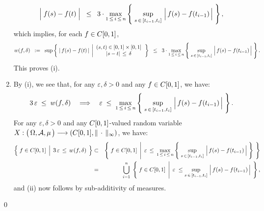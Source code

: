 \begin{enumerate}
		\begin{equation*}
		\left\vert\;f(s)\overset{{\color{white}.}}{-}f(t)\;\right\vert
		\;\;\leq\;\;
			3\cdot\underset{1\,\leq\,i\,\leq\,n}{\max}\left\{\;
				\sup_{s\,\in\,[t_{i-1},t_{i}]}\,\left\vert\,\overset{{\color{white}.}}{f}(s) - f(t_{i-1})\,\right\vert
			\;\right\},
		\end{equation*}
		which implies, for each $f \in C[0,1]$,
		\begin{equation*}
		w(f,\delta)
		\;\;:=\;\;
		\sup\left\{\;
			\left\vert\,f(s) - f(t)\,\right\vert
			\;\left\vert
			\begin{array}{c} (s,t) \in [0,1] \times [0,1] \\ \vert s - t \vert\,\leq\,\delta \end{array}
			\right.
		\right\}
		\;\;\leq\;\;
			3\cdot\underset{1\,\leq\,i\,\leq\,n}{\max}\left\{\;
				\sup_{s\,\in\,[t_{i-1},t_{i}]}\,\left\vert\,\overset{{\color{white}.}}{f}(s) - f(t_{i-1})\,\right\vert
			\;\right\}.
		\end{equation*}
		This proves (i).
\item	By (i), we see that, for any $\varepsilon, \delta > 0$ and any $f \in C[0,1]$, we have:
		\begin{equation*}
		3\,\varepsilon \;\leq\; w(f,\delta) 
		\quad\Longrightarrow\quad
		\varepsilon
		\;\leq\;
		\underset{1\,\leq\,i\,\leq\,n}{\max}\left\{\;
			\sup_{s\,\in\,[t_{i-1},t_{i}]}\,\left\vert\,\overset{{\color{white}.}}{f}(s) - f(t_{i-1})\,\right\vert
		\;\right\}.
		\end{equation*}
		For any $\varepsilon, \delta > 0$ and any $C[0,1]$-valued random variable
		$X : \left(\,\Omega,\mathcal{A},\overset{{\color{white}.}}{\mu}\,\right) \longrightarrow \left(\Czo,\Vert\,\cdot\,\Vert_{\infty}\right)$,
		we have:
		\begin{eqnarray*}
		\left\{\;
			f \in \Czo
			\;\left\vert\;\,
			3\,\varepsilon\,\overset{{\color{white}.}}{\leq}\,w(f,\delta)
			\right.
		\;\right\}
		&\subset&
		\left\{\;
			f \in \Czo
			\;\left\vert\;\,
			\varepsilon\,\overset{{\color{white}.}}{\leq}\,
			\underset{1\,\leq\,i\,\leq\,n}{\max}\left\{\;
				\sup_{s\,\in\,[t_{i-1},t_{i}]}\,\left\vert\,f(s) \overset{{\color{white}.}}{-} f(t_{i-1})\,\right\vert
			\;\right\}
			\right.
		\;\right\}
		\\
		&=&
		\overset{n}{\underset{i=1}{\bigcup}}\;
		\left\{\;
			f \in \Czo
			\;\left\vert\;\,
			\varepsilon\;\overset{{\color{white}.}}{\leq}
				\sup_{s\,\in\,[t_{i-1},t_{i}]}\,\left\vert\,f(s) \overset{{\color{white}.}}{-} f(t_{i-1})\,\right\vert
			\right.
		\;\right\},
		\end{eqnarray*}
		and (ii) now follows by sub-additivity of measures.
\end{enumerate}
\qed

